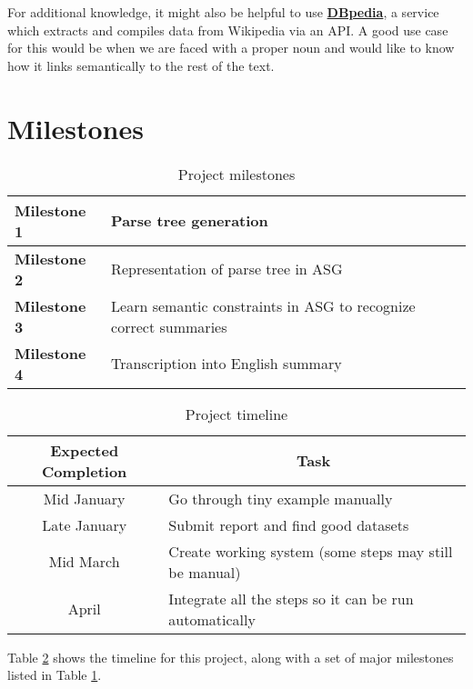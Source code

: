 For additional knowledge, it might also be helpful to use \textbf{\href{https://wiki.dbpedia.org/develop/datasets}{DBpedia}}, a service which extracts and compiles data from Wikipedia via an API. A good use case for this would be when we are faced with a proper noun and would like to know how it links semantically to the rest of the text.

\section{Milestones}

\begin{table}[H]
\centering
\begin{tabular}{@{}ll@{}}
\toprule
\textbf{Milestone 1} & Parse tree generation \\ \midrule
\textbf{Milestone 2} & Representation of parse tree in ASG \\ \midrule
\textbf{Milestone 3} & Learn semantic constraints in ASG to recognize correct summaries \\ \midrule
\textbf{Milestone 4} & Transcription into English summary  \\ \bottomrule
\end{tabular}
\caption{Project milestones}
\label{table:milestones}
\end{table}

\begin{table}[H]
\centering
\begin{tabular}{@{}cl@{}}
\toprule
\textbf{Expected Completion} & \multicolumn{1}{c}{\textbf{Task}} \\ \midrule
Mid January & Go through tiny example manually \\
Late January & Submit report and find good datasets \\
Mid March & Create working system (some steps may still be manual) \\
April & Integrate all the steps so it can be run automatically \\ \bottomrule
\end{tabular}
\caption{Project timeline}
\label{table:timeline}
\end{table}

Table \ref{table:timeline} shows the timeline for this project, along with a set of major milestones listed in Table \ref{table:milestones}.